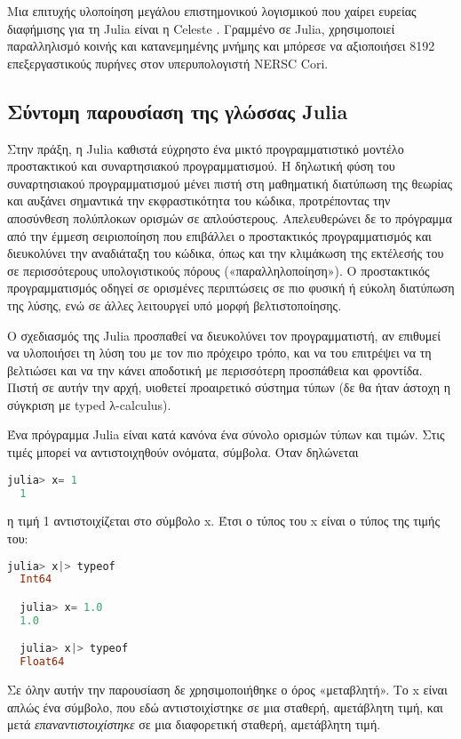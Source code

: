   Μια επιτυχής υλοποίηση μεγάλου επιστημονικού λογισμικού που χαίρει ευρείας διαφήμισης για τη Julia είναι η Celeste \cite{regierLearningAstronomicalCatalog2016}.
  Γραμμένο σε Julia, χρησιμοποιεί παραλληλισμό κοινής και κατανεμημένης μνήμης και μπόρεσε να αξιοποιήσει
  8192 επεξεργαστικούς πυρήνες στον υπερυπολογιστή NERSC Cori.

\subsection{Σύντομη παρουσίαση της γλώσσας Julia}

  Στην πράξη, η Julia καθιστά εύχρηστο ένα μικτό προγραμματιστικό μοντέλο προστακτικού και συναρτησιακού προγραμματισμού.
  Η δηλωτική φύση του συναρτησιακού προγραμματισμού μένει πιστή στη μαθηματική διατύπωση της θεωρίας και αυξάνει σημαντικά την εκφραστικότητα του κώδικα,
  προτρέποντας την αποσύνθεση πολύπλοκων ορισμών σε απλούστερους.
  Απελευθερώνει δε το πρόγραμμα από την έμμεση σειριοποίηση που επιβάλλει ο προστακτικός προγραμματισμός και διευκολύνει την αναδιάταξη του κώδικα,
  όπως και την κλιμάκωση της εκτέλεσής του σε περισσότερους υπολογιστικούς πόρους («παραλληλοποίηση»).
  Ο προστακτικός προγραμματισμός οδηγεί σε ορισμένες περιπτώσεις σε πιο φυσική ή εύκολη διατύπωση της λύσης, ενώ σε άλλες λειτουργεί υπό μορφή βελτιστοποίησης.

  Ο σχεδιασμός της Julia προσπαθεί να διευκολύνει τον προγραμματιστή, αν επιθυμεί να υλοποιήσει τη λύση του με τον πιο πρόχειρο τρόπο,
  και να του επιτρέψει να τη βελτιώσει και να την κάνει αποδοτική με περισσότερη προσπάθεια και φροντίδα.
  Πιστή σε αυτήν την αρχή, υιοθετεί προαιρετικό σύστημα τύπων (δε θα ήταν άστοχη η σύγκριση με typed λ-calculus).

  Ένα πρόγραμμα Julia είναι κατά κανόνα ένα σύνολο ορισμών τύπων και τιμών. Στις τιμές μπορεί να αντιστοιχηθούν ονόματα, σύμβολα. Όταν δηλώνεται
  \begin{lstlisting}[language=julia]
  julia> x= 1
  1
  \end{lstlisting}
  η τιμή 1 αντιστοιχίζεται στο σύμβολο x.
  Έτσι ο τύπος του x είναι ο τύπος της τιμής του:
  \begin{lstlisting}[language=julia]
  julia> x|> typeof
  Int64

  julia> x= 1.0
  1.0

  julia> x|> typeof
  Float64
  \end{lstlisting}
  Σε όλην αυτήν την παρουσίαση δε χρησιμοποιήθηκε ο όρος «μεταβλητή». Το x είναι απλώς ένα σύμβολο, που εδώ αντιστοιχίστηκε σε μια σταθερή, αμετάβλητη τιμή,
  και μετά \textit{επαναντιστοιχίστηκε} σε μια διαφορετική σταθερή, αμετάβλητη τιμή.


